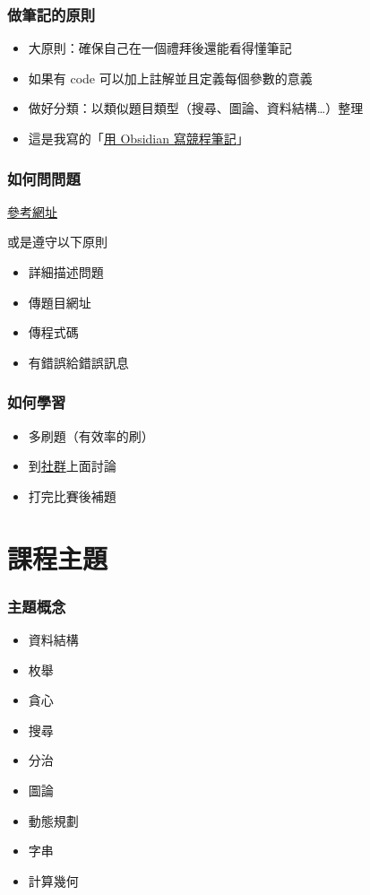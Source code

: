 \documentclass[mathserif]{beamer}
\begin{document}
\begin{frame}
    \frametitle{做筆記的原則}
    \begin{itemize}
        \item 大原則：確保自己在一個禮拜後還能看得懂筆記
        \item 如果有 code 可以加上註解並且定義每個參數的意義
        \item 做好分類：以類似題目類型（搜尋、圖論、資料結構…）整理
        \vspace{0.5cm}
        \item 這是我寫的「\href{https://hackmd.io/@temmie950807/rJL9TfXpj}{用 Obsidian 寫競程筆記}」
    \end{itemize}
\end{frame}

\begin{frame}
    \frametitle{如何問問題}
    \href{https://github.com/ryanhanwu/How-To-Ask-Questions-The-Smart-Way}{參考網址}
    
    \vspace{0.5cm}
    或是遵守以下原則
    \begin{itemize}
        \item 詳細描述問題
        \item 傳題目網址
        \item 傳程式碼
        \item 有錯誤給錯誤訊息
    \end{itemize}
\end{frame}

\begin{frame}
    \frametitle{如何學習}
    \begin{itemize}
        \item 多刷題（有效率的刷）
        \item 到\href{https://discord.gg/cisc}{社群}上面討論
        \item 打完比賽後補題
    \end{itemize}
\end{frame}

\section{課程主題}

\begin{frame}
    \frametitle{主題概念}
    \begin{itemize}
        \item 資料結構
        \item 枚舉
        \item 貪心
        \item 搜尋
        \item 分治
        \item 圖論
        \item 動態規劃
        \item 字串
        \item 計算幾何
    \end{itemize}
\end{frame}
\end{document}
